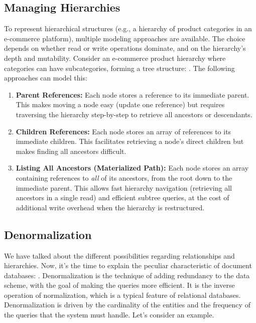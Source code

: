 \subsection{Managing Hierarchies}

To represent hierarchical structures (e.g., a hierarchy of product categories in an e-commerce platform), multiple modeling approaches are available. The choice depends on whether read or write operations dominate, and on the hierarchy's depth and mutability.
    Consider an e-commerce product hierarchy where categories can have subcategories, forming a tree structure: . The following approaches can model this:

    \begin{enumerate}
        \item \textbf{Parent References:} Each node stores a reference to its immediate parent. This makes moving a node easy (update one reference) but requires traversing the hierarchy step-by-step to retrieve all ancestors or descendants.
        \item \textbf{Children References:} Each node stores an array of references to its immediate children. This facilitates retrieving a node's direct children but makes finding all ancestors difficult.
        \item \textbf{Listing All Ancestors (Materialized Path):} Each node stores an array containing references to \emph{all} of its ancestors, from the root down to the immediate parent. This allows fast hierarchy navigation (retrieving all ancestors in a single read) and efficient subtree queries, at the cost of additional write overhead when the hierarchy is restructured.
    \end{enumerate}

\subsection{Denormalization}
We have talked about the different possibilities regarding relationships and hierarchies. Now, it's the time to explain the peculiar characteristic of document databases: .
Denormalization is the technique of adding redundancy to the data scheme, with the goal of making the queries more efficient. It is the inverse operation of normalization, which is a typical feature of relational databases.
Denormalization is driven by the cardinality of the entities and the frequency of the queries that the system must handle.
Let's consider an example.

